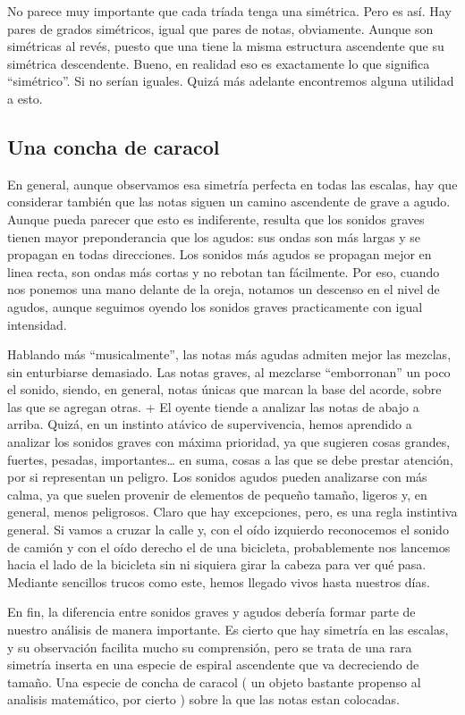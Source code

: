 \documentclass[]{article}
\begin{document}
No parece muy importante que cada tríada tenga una simétrica. Pero es así. Hay pares de grados simétricos, igual que pares de notas, obviamente. Aunque son simétricas al revés, puesto que una tiene la misma estructura ascendente que su simétrica descendente. Bueno, en realidad eso es exactamente lo que significa ``simétrico''. Si no serían iguales. Quizá más adelante encontremos alguna utilidad a esto.

\subsection{Una concha de caracol}

En general, aunque observamos esa simetría perfecta en todas las escalas, hay que considerar también que las notas siguen un camino ascendente de grave a agudo. Aunque pueda parecer que esto es indiferente, resulta que los sonidos graves tienen mayor preponderancia que los agudos: sus ondas son más largas y se propagan en todas direcciones. Los sonidos más agudos se propagan mejor en linea recta, son ondas más cortas y no rebotan tan fácilmente. Por eso, cuando nos ponemos una mano delante de la oreja, notamos un descenso en el nivel de agudos, aunque seguimos oyendo los sonidos graves practicamente con igual intensidad.

Hablando más ``musicalmente'', las notas más agudas admiten mejor las mezclas, sin enturbiarse demasiado. Las notas graves, al mezclarse ``emborronan'' un poco el sonido, siendo, en general, notas únicas que marcan la base del acorde, sobre las que se agregan otras. + El oyente tiende a analizar las notas de abajo a arriba. Quizá, en un instinto atávico de supervivencia, hemos aprendido a analizar los sonidos graves con máxima prioridad, ya que sugieren cosas grandes, fuertes, pesadas, importantes\ldots{} en suma, cosas a las que se debe prestar atención, por si representan un peligro. Los sonidos agudos pueden analizarse con más calma, ya que suelen provenir de elementos de pequeño tamaño, ligeros y, en general, menos peligrosos. Claro que hay excepciones, pero, es una regla instintiva general. Si vamos a cruzar la calle y, con el oído izquierdo reconocemos el sonido de camión y con el oído derecho el de una bicicleta, probablemente nos lancemos hacia el lado de la bicicleta sin ni siquiera girar la cabeza para ver qué pasa. Mediante sencillos trucos como este, hemos llegado vivos hasta nuestros días.

En fin, la diferencia entre sonidos graves y agudos debería formar parte de nuestro análisis de manera importante. Es cierto que hay simetría en las escalas, y su observación facilita mucho su comprensión, pero se trata de una rara simetría inserta en una especie de espiral ascendente que va decreciendo de tamaño. Una especie de concha de caracol ( un objeto bastante propenso al analisis matemático, por cierto ) sobre la que las notas estan colocadas.
\end{document}
